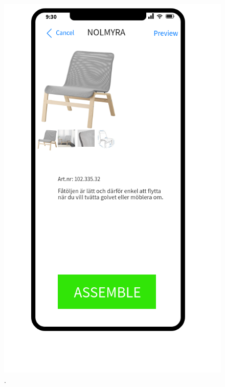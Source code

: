 \begin{figure}[hbtp]
\begin{center}
\includegraphics[height = 0.4\textheight]{./Images/Detail_view.png}
\caption{.}
\label{fig:detail-view}
\end{center}
\end{figure}


